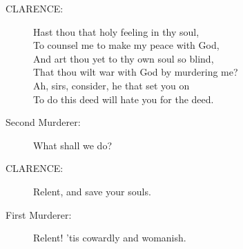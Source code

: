 \documentclass{article}
\begin{document}
\begin{description}
\item[CLARENCE:] 
\hspace{1pt}Hast thou that holy feeling in thy soul,\\
\hspace{1pt}To counsel me to make my peace with God,\\
\hspace{1pt}And art thou yet to thy own soul so blind,\\
\hspace{1pt}That thou wilt war with God by murdering me?\\
\hspace{1pt}Ah, sirs, consider, he that set you on\\
\hspace{1pt}To do this deed will hate you for the deed.\\
\end{description}
\begin{description}
\item[Second Murderer:] 
\hspace{1pt}What shall we do?\\
\end{description}
\begin{description}
\item[CLARENCE:] 
\hspace{1pt}Relent, and save your souls.\\
\end{description}
\begin{description}
\item[First Murderer:] 
\hspace{1pt}Relent! 'tis cowardly and womanish.\\
\end{description}
\end{document}
